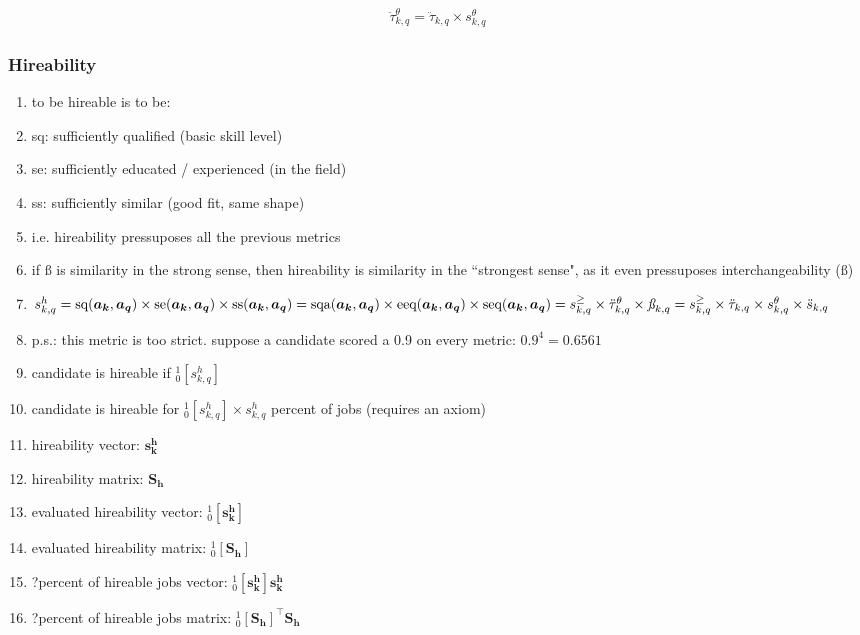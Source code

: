 \documentclass{elsarticle} %
\begin{document}
\begin{gather}
    \ddot{\tau}_{k,q}^{\theta} = \ddot{\tau}_{k,q} \times s_{k,q}^{\theta}
\end{gather}

\subsubsection{Hireability}
\begin{enumerate}
    \item to be hireable is to be:
    \item sq: sufficiently qualified (basic skill level)
    \item se: sufficiently educated / experienced (in the field)
    \item ss: sufficiently similar (good fit, same shape)
    \item i.e. hireability pressuposes all the previous metrics
    \item if $\textit{\ss}$ is similarity in the strong sense, then hireability is similarity
          in the ``strongest sense", as it even pressuposes interchangeability ($\textit{\ss}$)
    \item $
              s_{k,q}^{h} =
              \text{sq}(\boldsymbol{a_k},\boldsymbol{a_q}) \times
              \text{se}(\boldsymbol{a_k},\boldsymbol{a_q}) \times
              \text{ss}(\boldsymbol{a_k},\boldsymbol{a_q}) = \\
              \text{sqa}(\boldsymbol{a_k},\boldsymbol{a_q}) \times
              \text{eeq}(\boldsymbol{a_k},\boldsymbol{a_q}) \times
              \text{seq}(\boldsymbol{a_k},\boldsymbol{a_q}) = \\
              s_{k,q}^{\geq} \times
              \ddot{\tau}_{k,q}^{\theta} \times
              \textit{\ss}_{k,q} = \\
              s_{k,q}^{\geq} \times
              \ddot{\tau}_{k,q} \times
              s_{k,q}^{\theta} \times
              \ddot{s}_{k,q}
          $
    \item p.s.: this metric is too strict. suppose a candidate scored a 0.9 on every metric: $0.9 ^ 4 = 0.6561$
    \item candidate is hireable if $_{0}^{1}[s_{k,q}^{h}]$
    \item candidate is hireable for $_{0}^{1}[s_{k,q}^{h}] \times s_{k,q}^{h}$ percent of jobs (requires an axiom)
    \item hireability vector: $\boldsymbol{s_{k}^{h}}$
    \item hireability matrix: $\boldsymbol{\textbf{S}_{h}}$
    \item evaluated hireability vector: $_{0}^{1}[\boldsymbol{s_{k}^{h}}]$
    \item evaluated hireability matrix: $_{0}^{1}[\boldsymbol{\textbf{S}_{h}}]$
    \item ?percent of hireable jobs vector: $_{0}^{1}[\boldsymbol{s_{k}^{h}}]\boldsymbol{s_{k}^{h}}$
    \item ?percent of hireable jobs matrix: $_{0}^{1}[\boldsymbol{\textbf{S}_{h}}]^{\top}\boldsymbol{\textbf{S}_{h}}$
\end{enumerate}
\end{document}
